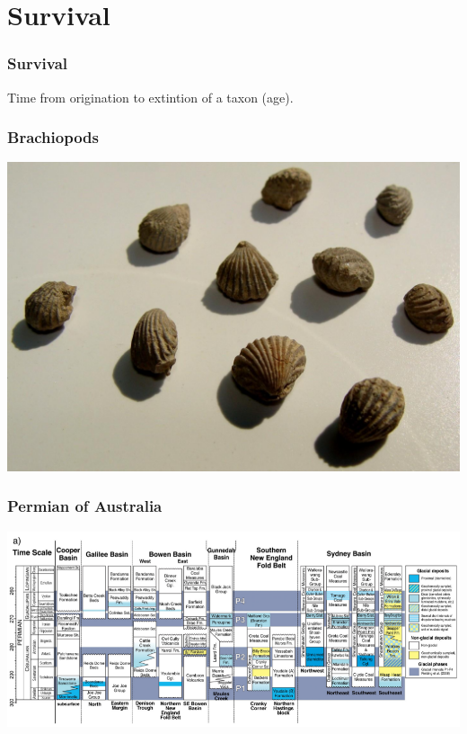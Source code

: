 \documentclass{beamer}
\begin{document}
\section{Survival}

\begin{frame}
  \frametitle{Survival}

  \begin{definition}
    Time from origination to extintion of a taxon (age).
  \end{definition}

\end{frame}

\begin{frame}
  \frametitle{Brachiopods}
  \includegraphics[height = 0.9\textheight, width = \textwidth, keepaspectratio = true]{figure/permian_brac}

  \tiny{}
\end{frame}

\begin{frame}
  \frametitle{Permian of Australia}
  \begin{center}
    \includegraphics[height = 0.8\textheight, width = \textwidth, keepaspectratio = true]{figure/glacial}

    \tiny{}
  \end{center}
\end{frame}
\end{document}
